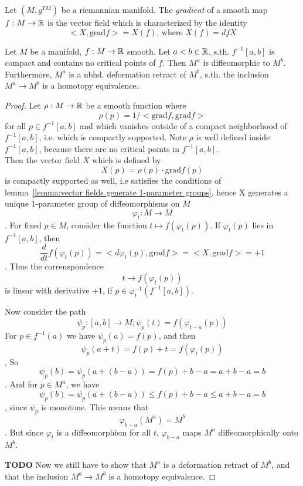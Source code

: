\documentclass[a4paper,11pt]{article}
\begin{document}
\begin{definition}[gradient]
   \label{def:gradient}
   Let $(M, g^{TM})$ be a riemannian manifold. The \textit{gradient} of a smooth 
   map $f: M \rightarrow {\mathbb R}$ is the vector field which is characterized by the 
   identity 
   \[ <X, \text{grad} f> = X(f) \text{, where } X(f) = dfX \]
\end{definition}

\begin{theorem}
   \label{theorem:1st deformation lemma}
   Let $M$ be a manifold, $f: M \rightarrow {\mathbb R}$ smooth. Let $a < b \in {\mathbb R}$, 
   s.th. $f^{-1}[a, b]$ is compact and contains no critical points of $f$. Then 
   $M^a$ is diffeomorphic to $M^b$. \\ 
   Furthermore, $M^a$ is a nbhd. deformation retract of $M^b$, s.th. the 
   inclusion $M^a \rightarrow M^b$ is a homotopy equivalence.
\end{theorem}

\begin{proof}
   Let $\rho: M \rightarrow {\mathbb R}$ be a smooth function where 
   \[ \rho(p) = 1/<\text{grad} f, \text{grad} f> \]
   for all $p \in f^{-1}[a, b]$ and which vanishes outside of a compact 
   neighborhood of $f^{-1}[a, b]$, i.e. which is compactly supported.
   Note $\rho$ is well defined inside $f^{-1}[a, b]$, because there are no 
   critical points in $f^{-1}[a, b]$. \\ 
   Then the vector field $X$ which is defined by
   \[ X(p) = \rho(p) \cdot \text{grad} f (p) \]
   is compactly supported as well, i.e satisfies the conditions of 
   lemma~\ref{lemma:vector fields generate 1-parameter groups}, hence X generates 
   a unique 1-parameter group of diffeomorphisms on $M$
   \[ \varphi_t : M \rightarrow M \]. 
   For fixed $p \in M$, consider the function 
   $ t \mapsto f(\varphi_t(p)) $. If $\varphi_t(p)$ lies in $f^{-1}[a, b]$, then
   \[ \frac{d}{dt}f (\varphi_t(p)) = <d\varphi_t(p), \text{grad}f> = <X, \text{grad}f> = + 1 \].
   Thus the correnspondence 
   \[ t \rightarrow f(\varphi_t(p)) \]
   is linear with derivative $+1$, if $p \in \varphi_t^{-1}(f^{-1}[a, b])$. 

   Now consider the path 
   \[ \psi_p:[a, b] \rightarrow M; \psi_p(t) = f(\varphi_{t - a}(p)) \]
   For $p \in f^{-1}(a)$ we have $\psi_p(a) = f(p)$, and then 
   \[ \psi_p(a + t) = f(p) + t = f(\varphi_t(p)) \], So 
   \[ \psi_p(b) = \psi_p(a + (b - a)) = f(p) + b - a = a + b - a = b \].
   And for $p \in M^a$, we have 
   \[ \psi_p(b) = \psi_p(a + (b - a)) \leq f(p) + b - a \leq a + b - a = b \]
   , since $\psi_p$ is monotone.
   This means that 
   \[ \varphi_{b-a}(M^a) = M^b \].
   But since $\varphi_t$ is a diffeomorphism for all $t$, $\varphi_{b-a}$ maps 
   $M^a$ diffeomorphically onto $M^b$. 
   
   \textbf{TODO}
   Now we still have to show that $M^a$ is a deformation retract of $M^b$, and 
   that the inclusion $M^a \rightarrow M^b$ is a homotopy equivalence. 
\end{proof}
\end{document}
